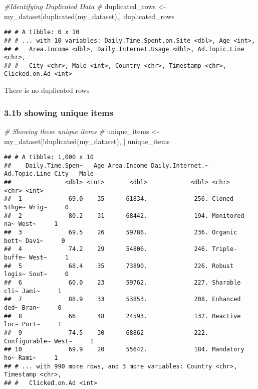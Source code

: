 \documentclass[
]{article}
\newenvironment{Shaded}{\begin{snugshade}}{\end{snugshade}}
\newcommand{\CommentTok}[1]{\textcolor[rgb]{0.56,0.35,0.01}{\textit{#1}}}
\newcommand{\FunctionTok}[1]{\textcolor[rgb]{0.00,0.00,0.00}{#1}}
\newcommand{\NormalTok}[1]{#1}
\newcommand{\OtherTok}[1]{\textcolor[rgb]{0.56,0.35,0.01}{#1}}
\newcommand{\SpecialCharTok}[1]{\textcolor[rgb]{0.00,0.00,0.00}{#1}}
\begin{document}
\begin{Shaded}
\begin{Highlighting}[]
\CommentTok{\#Identifying Duplicated Data}
\CommentTok{\#}
\NormalTok{duplicated\_rows }\OtherTok{\textless{}{-}}\NormalTok{ my\_dataset[}\FunctionTok{duplicated}\NormalTok{(my\_dataset),]}
\NormalTok{duplicated\_rows}
\end{Highlighting}
\end{Shaded}

\begin{verbatim}
## # A tibble: 0 x 10
## # ... with 10 variables: Daily.Time.Spent.on.Site <dbl>, Age <int>,
## #   Area.Income <dbl>, Daily.Internet.Usage <dbl>, Ad.Topic.Line <chr>,
## #   City <chr>, Male <int>, Country <chr>, Timestamp <chr>, Clicked.on.Ad <int>
\end{verbatim}

There is no duplicated rows

\hypertarget{b-showing-unique-items}{%
\subsubsection{3.1b showing unique items}\label{b-showing-unique-items}}

\begin{Shaded}
\begin{Highlighting}[]
\CommentTok{\# Showing these unique items}
\CommentTok{\#}
\NormalTok{unique\_items }\OtherTok{\textless{}{-}}\NormalTok{ my\_dataset[}\SpecialCharTok{!}\FunctionTok{duplicated}\NormalTok{(my\_dataset), ]}
\NormalTok{unique\_items}
\end{Highlighting}
\end{Shaded}

\begin{verbatim}
## # A tibble: 1,000 x 10
##    Daily.Time.Spen~   Age Area.Income Daily.Internet.~ Ad.Topic.Line City   Male
##               <dbl> <int>       <dbl>            <dbl> <chr>         <chr> <int>
##  1             69.0    35      61834.             256. Cloned 5thge~ Wrig~     0
##  2             80.2    31      68442.             194. Monitored na~ West~     1
##  3             69.5    26      59786.             236. Organic bott~ Davi~     0
##  4             74.2    29      54806.             246. Triple-buffe~ West~     1
##  5             68.4    35      73890.             226. Robust logis~ Sout~     0
##  6             60.0    23      59762.             227. Sharable cli~ Jami~     1
##  7             88.9    33      53853.             208. Enhanced ded~ Bran~     0
##  8             66      48      24593.             132. Reactive loc~ Port~     1
##  9             74.5    30      68862              222. Configurable~ West~     1
## 10             69.9    20      55642.             184. Mandatory ho~ Rami~     1
## # ... with 990 more rows, and 3 more variables: Country <chr>, Timestamp <chr>,
## #   Clicked.on.Ad <int>
\end{verbatim}
\end{document}

